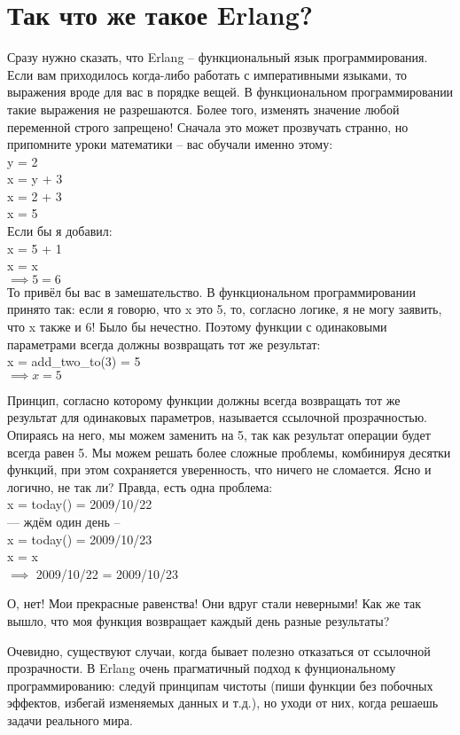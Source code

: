 \section{Так что же такое Erlang?}
\label{so-whats-erlang}
Сразу нужно сказать, что Erlang \--- функциональный язык программирования.
Если вам приходилось когда\--либо работать с императивными языками, то выражения вроде  для вас в порядке вещей.
В функциональном программировании такие выражения не разрешаются.
Более того, изменять значение любой переменной строго запрещено!
Сначала это может прозвучать странно, но припомните уроки математики \--- вас обучали именно этому:\\ 
y = 2\\ 
x = y + 3\\ 
x = 2 + 3\\ 
x = 5\\ 
Если бы я добавил:\\ 
x = 5 + 1\\ 
x = x\\ 
$\implies 5 = 6$\\ 

То привёл бы вас в замешательство.
В функциональном программировании принято так: если я говорю, что x это 5, то, согласно логике, я не могу заявить, что x также и 6!
Было бы нечестно.
Поэтому функции с одинаковыми параметрами всегда должны возвращать тот же результат:\\  
x = add\_two\_to(3) = 5\\ 
$\implies x = 5$
 
Принцип, согласно которому функции должны всегда возвращать тот же результат для одинаковых параметров, называется ссылочной прозрачностью.
Опираясь на него, мы можем заменить  на 5, так как результат операции  будет всегда равен 5.
Мы можем решать более сложные проблемы, комбинируя десятки функций, при этом сохраняется уверенность, что ничего не сломается.
Ясно и логично, не так ли?
Правда, есть одна проблема:\\ 
x = today() = 2009/10/22\\ 
--- ждём один день --\\ 
x = today() = 2009/10/23\\ 
x = x\\ 
$\implies$ 2009/10/22 = 2009/10/23 

О, нет!
Мои прекрасные равенства!
Они вдруг стали неверными!
Как же так вышло, что моя функция возвращает каждый день разные результаты?

Очевидно, существуют случаи, когда бывает полезно отказаться от ссылочной прозрачности.
В Erlang очень прагматичный подход к фунциональному программированию: следуй принципам чистоты (пиши функции без побочных эффектов, избегай изменяемых данных и т.д.), но уходи от них, когда решаешь задачи реального мира.

